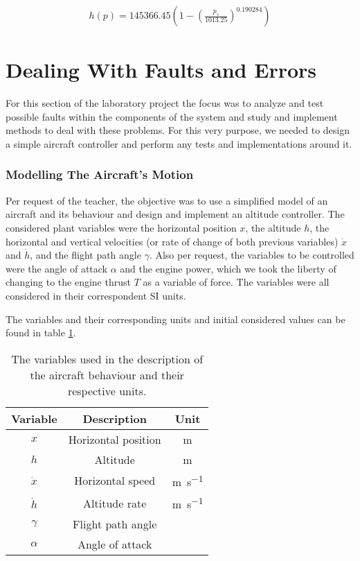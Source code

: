 \documentclass[english,palatino]{ist-report}
\begin{document}
\begin{gather*}
	h(p) = 145366.45\left(1 - \left(\frac{p_s}{1013.25}\right)^{0.190284}\right)
\end{gather*}

\pagebreak
\part{Dealing With Faults and Errors}

For this section of the laboratory project the focus was to analyze and test possible faults within the components of the system and study and implement methods to deal with these problems. For this very purpose, we needed to design a simple aircraft controller and perform any tests and implementations around it.

\section{Modelling The Aircraft's Motion}\label{sec:plant}

Per request of the teacher, the objective was to use a simplified model of an aircraft and its behaviour and design and implement an altitude controller. The considered plant variables were the horizontal position $x$, the altitude $h$, the horizontal and vertical velocities (or rate of change of both previous variables) $\dot{x}$ and $\dot{h}$, and the flight path angle $\gamma$. Also per request, the variables to be controlled were the angle of attack $\alpha$ and the engine power, which we took the liberty of changing to the engine thrust $T$ as a variable of force. The variables were all considered in their correspondent SI units.

The variables and their corresponding units and initial considered values can be found in table \ref{tab:controllervars}.
\begin{table}[ht]
	\centering
	\begin{tabular}{c|c|c}\toprule
		Variable		& Description			& Unit						\\
		\midrule
		$x$				& Horizontal position	& \si{\meter}				\\
		$h$				& Altitude				& \si{\meter}				\\
		$\dot{x}$		& Horizontal speed		& \si{\meter\per\second}	\\
		$\dot{h}$		& Altitude rate			& \si{\meter\per\second}	\\
		$\gamma$		& Flight path angle		& 							\\
		$\alpha$		& Angle of attack		& 							\\
		\bottomrule
	\end{tabular}
	\caption{The variables used in the description of the aircraft behaviour and their respective units.}
	\label{tab:controllervars}
\end{table}
\end{document}
